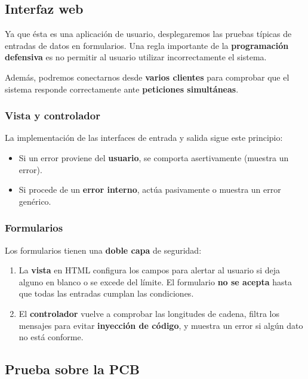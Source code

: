 \documentclass[10pt,a4paper]{article}
\begin{document}
	\subsection{Interfaz web}
	
	Ya que ésta es una aplicación de usuario, desplegaremos las pruebas típicas de entradas de datos en formularios. Una regla importante de la \textbf{programación defensiva} es no permitir al usuario utilizar incorrectamente el sistema.
	
	Además, podremos conectarnos desde \textbf{varios clientes} para comprobar que el sistema responde correctamente ante \textbf{peticiones simultáneas}.
	
	\subsubsection*{Vista y controlador}
	
	La implementación de las interfaces de entrada y salida sigue este principio:
	
	\begin{itemize}
		\item Si un error proviene del \textbf{usuario}, se comporta asertivamente (muestra un error).
		\item Si procede de un \textbf{error interno}, actúa pasivamente o muestra un error genérico.
	\end{itemize}
	
	\subsubsection*{Formularios}
	
	Los formularios tienen una \textbf{doble capa} de seguridad:
	 
	\begin{enumerate}
		\item La \textbf{vista} en HTML configura los campos para alertar al usuario si deja alguno en blanco o se excede del límite. El formulario \textbf{no se acepta} hasta que todas las entradas cumplan las condiciones.
	 	
	 	\item El \textbf{controlador} vuelve a comprobar las longitudes de cadena, filtra los mensajes para evitar \textbf{inyección de código}, y muestra un error si algún dato no está conforme.
	\end{enumerate}
	
	\subsection{Prueba sobre la PCB}
	
\end{document}
